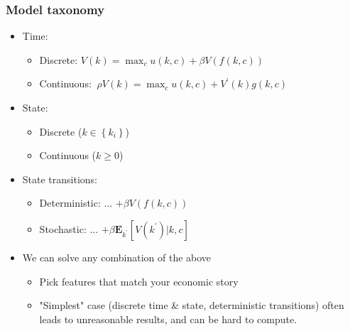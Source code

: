 \documentclass[bigger]{beamer}
\begin{document}
\begin{frame}

\frametitle{Model taxonomy}

\begin{itemize}
\item Time:

\begin{itemize}
\item Discrete: $V\left( k\right) =\max_{c}u\left( k,c\right) +\beta V\left(
f(k,c)\right) $

\item Continuous: $\ \rho V\left( k\right) =\max_{c}u(k,c)+V^{\prime }\left(
k\right) g(k,c)$
\end{itemize}

\item State:

\begin{itemize}
\item Discrete ($k\in \left\{ k_{i}\right\} $)

\item Continuous ($k\geq 0$)
\end{itemize}

\item State transitions:

\begin{itemize}
\item Deterministic: ... $+\beta V\left( f(k,c)\right) $

\item Stochastic: ... $+\beta \mathbf{E}_{k^{\prime }}\left[ V\left(
k^{\prime }\right) |k,c\right] $
\end{itemize}

\item We can solve any combination of the above

\begin{itemize}
\item Pick features that match your economic story

\item "Simplest" case (discrete time \& state, deterministic transitions)
often leads to unreasonable results, \newline
and can be hard to compute.
\end{itemize}
\end{itemize}

\end{frame}%
\end{document}
